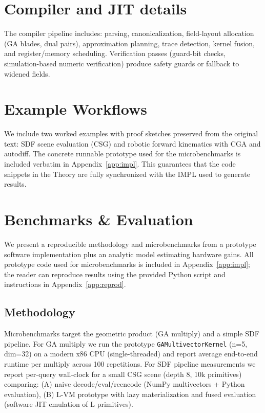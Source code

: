 \documentclass[11pt]{article}
\theoremstyle{definition}
\theoremstyle{plain}
\begin{document}
\section{Compiler and JIT details}
The compiler pipeline includes: parsing, canonicalization, field-layout allocation (GA blades, dual pairs), approximation planning, trace detection, kernel fusion, and register/memory scheduling. Verification passes (guard-bit checks, simulation-based numeric verification) produce safety guards or fallback to widened fields.

\section{Example Workflows}
We include two worked examples with proof sketches preserved from the original text: SDF scene evaluation (CSG) and robotic forward kinematics with CGA and autodiff. The concrete runnable prototype used for the microbenchmarks is included verbatim in Appendix~\ref{app:impl}. This guarantees that the code snippets in the Theory are fully synchronized with the IMPL used to generate results.

\section{Benchmarks \& Evaluation}
We present a reproducible methodology and microbenchmarks from a prototype software implementation plus an analytic model estimating hardware gains. All prototype code used for microbenchmarks is included in Appendix~\ref{app:impl}; the reader can reproduce results using the provided Python script and instructions in Appendix~\ref{app:reprod}.

\subsection{Methodology}
Microbenchmarks target the geometric product (GA multiply) and a simple SDF pipeline. For GA multiply we run the prototype \texttt{GAMultivectorKernel} (n=5, dim=32) on a modern x86 CPU (single-threaded) and report average end-to-end runtime per multiply across 100 repetitions. For SDF pipeline measurements we report per-query wall-clock for a small CSG scene (depth 8, 10k primitives) comparing: (A) naive decode/eval/reencode (NumPy multivectors + Python evaluation), (B) L-VM prototype with lazy materialization and fused evaluation (software JIT emulation of L primitives).
\end{document}

